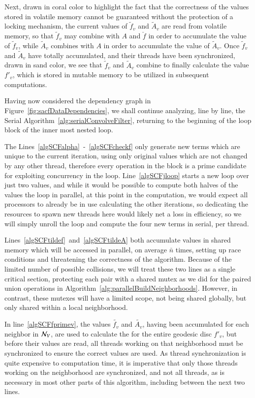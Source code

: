 Next, drawn in coral color to highlight the fact that the correctness of the values stored in volatile memory cannot be guaranteed without the protection of a locking mechanism, the current values of $\tilde{f}_v$ and $\tilde{A}_v$ are read from volatile memory, so that $\tilde{f}_v$ may combine with $A$ and $\check{f}$ in order to accumulate the value of $\tilde{f}_v$, while $\tilde{A}_v$ combines with $A$ in order to accumulate the value of $\tilde{A}_v$. Once $\tilde{f}_v$ and $\tilde{A}_v$ have totally accumulated, and their threads have been synchronized, drawn in sand color, we see that $\tilde{f}_v$ and $\tilde{A}_v$ combine to finally calculate the value $f'_v$, which is stored in mutable memory to be utilized in subsequent computations.

Having now considered the dependency graph in Figure~\ref{fig:sacfDataDependencies}, we shall continue analyzing, line by line, the Serial Algorithm~\ref{alg:serialConvolveFilter}, returning to the beginning of the loop block of the inner most nested loop.

The Lines~\ref{algSCFalpha}~-~\ref{algSCFcheckf} only generate new terms which are unique to the current iteration, using only original values which are not changed by any other thread, therefore every operation in the block is a prime candidate for exploiting concurrency in the loop. Line~\ref{algSCFjloop} starts a new loop over just two values, and while it would be possible to compute both halves of the values the loop in parallel, at this point in the computation, we would expect all processors to already be in use calculating the other iterations, so dedicating the resources to spawn new threads here would likely net a loss in efficiency, so we will simply unroll the loop and compute the four new terms in serial, per thread.

Lines~\ref{algSCFtildef}~and~\ref{algSCFtildeA} both accumulate values in shared memory which will be accessed in parallel, on average $\bar{n}$ times, setting up race conditions and threatening the correctness of the algorithm. Because of the limited number of possible collisions, we will treat these two lines as a single critical section, protecting each pair with a shared mutex as we did for the paired union operations in Algorithm~\ref{alg:parallelBuildNeighborhoods}. However, in contrast, these mutexes will have a limited scope, not being shared globally, but only shared within a local neighborhood.

In line~\ref{algSCFfprimev}, the values $\tilde{f_v}$ and $\tilde{A_v}$, having been accumulated for each neighbor in $\mathcal{N}_V$, are used to calculate the \wmfv{} for the entire geodesic disc $f'_v$, but before their values are read, all threads working on that neighborhood must be synchronized to ensure the correct values are used. As thread synchronization is quite expensive to computation time, it is imperative that only those threads working on the neighborhood are synchronized, and not all threads, as is necessary in most other parts of this algorithm, including between the next two lines.

